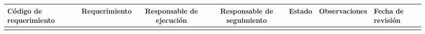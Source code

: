 %
\begin{table}[H]
	\centering
	\begin{tabular}{| p{2.4cm} | c | c | c | c | c | p{1.5cm} |}
	\hline
	\rowcolor{LightGrey}
	\textbf{C\'odigo de requerimiento} & \textbf{Requerimiento} & \textbf{Responsable de ejecuci\'on} & 
		\textbf{Responsable de seguimiento} & \textbf{Estado} & \textbf{Observaciones} & 
		\textbf{Fecha de revisi\'on} \\
	\hline
	& & & & & & \\
	\hline
	\end{tabular}
\end{table}
%